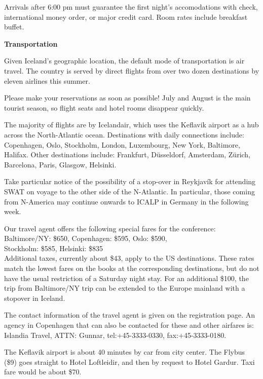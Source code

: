 Arrivals after 6:00 pm must guarantee the first night's accomodations
with check, international money order, or major credit card.  Room
rates include breakfast buffet.


\newpage
\parskip=4pt
\begin{center}
{\normalsize\bf Transportation}
\end{center}

Given Iceland's geographic location, the default mode of
transportation is air travel. The country is served by direct flights
from over two dozen destinations by eleven airlines this summer. 

Please make your reservations as soon as possible! July and August is the
main tourist season, so flight seats and hotel rooms disappear quickly.

The majority of flights are by Icelandair, which uses the Keflavik
airport as a hub across the North-Atlantic ocean. Destinations with 
daily connections include:
Copenhagen, Oslo, Stockholm, London, 
Luxembourg, New York, Baltimore, Halifax. Other destinations include:
Frankfurt, D\"usseldorf, Amsterdam, Z\"urich, Barcelona, Paris, Glasgow,
Helsinki.

Take particular notice of the possibility of a stop-over in
Reykjav\'ik for attending SWAT on voyage to the other side of the
N-Atlantic. In particular, those coming from N-America may continue
onwards to ICALP in Germany in the following week.

Our travel agent offers the following special fares for the conference: \\
\hspace*{2em}  Baltimore/NY: \$650, Copenhagen: \$595, Oslo: \$590, \\
\hspace*{2em} Stockholm: \$585, Helsinki: \$835 \\
Additional taxes, currently about \$43, apply to the US destinations.
These rates match the lowest fares on the books at the corresponding
destinations, but do not have the usual restriction of a Saturday
night stay.  For an additional \$100, the trip from Baltimore/NY trip can be
extended to the Europe mainland with a stopover in Iceland.

The contact information of the travel agent is given on the
registration page.  An agency in Copenhagen that can also be contacted
for these and other airfares is: Islandia Travel, ATTN: Gunnar,
tel:+45-3333-0330, fax:+45-3333-0180.

The Keflavik airport is about 40 minutes by car from city center.
The Flybus (\$9) goes straight to Hotel Loftleidir, and then by
request to Hotel Gardur. Taxi fare would be about \$70.

